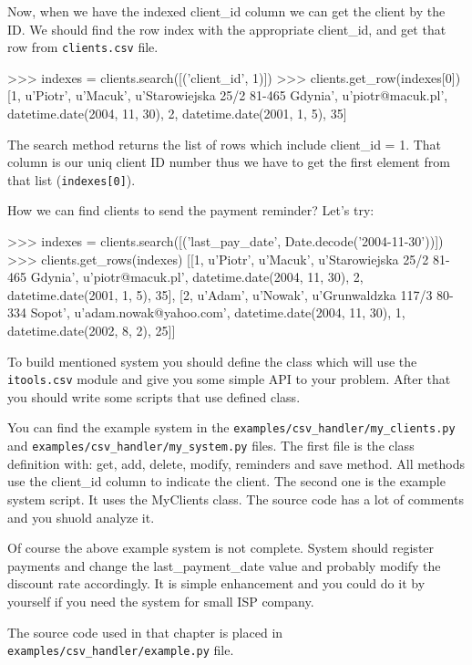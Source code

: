 \documentclass[a4paper]{book}
\begin{document}
Now, when we have the indexed client\_id column we can get the client
by the ID. We should find the row index with the appropriate client\_id,
and get that row from {\tt clients.csv} file.
\begin{code}
    >>> indexes = clients.search([('client_id', 1)])
    >>> clients.get_row(indexes[0])
    [1, u'Piotr', u'Macuk', u'Starowiejska 25/2 81-465 Gdynia', 
    u'piotr@macuk.pl', datetime.date(2004, 11, 30), 2, 
    datetime.date(2001, 1, 5), 35]
\end{code}
The search method returns the list of rows which include client\_id = 1.
That column is our uniq client ID number thus we have to get the first
element from that list ({\tt indexes[0]}).

How we can find clients to send the payment reminder? Let's try:
\begin{code}
    >>> indexes = clients.search([('last_pay_date', Date.decode('2004-11-30'))])
    >>> clients.get_rows(indexes)
    [[1, u'Piotr', u'Macuk', u'Starowiejska 25/2 81-465 Gdynia', 
    u'piotr@macuk.pl', datetime.date(2004, 11, 30), 2, 
    datetime.date(2001, 1, 5), 35], [2, u'Adam', u'Nowak', 
    u'Grunwaldzka 117/3 80-334 Sopot', u'adam.nowak@yahoo.com', 
    datetime.date(2004, 11, 30), 1, datetime.date(2002, 8, 2), 25]]
\end{code}

To build mentioned system you should define the class which will use the
{\tt itools.csv} module and give you some simple API to your problem. After
that you should write some scripts that use defined class.

You can find the example system in the 
{\tt examples/csv\_handler/my\_clients.py} and 
{\tt examples/csv\_handler/my\_system.py} files. The first file is the class
definition with: get, add, delete, modify, reminders and save method. 
All methods use the client\_id column to indicate the client. The second one
is the example system script. It uses the MyClients class. 
The source code has a lot of comments and you shuold analyze it.

Of course the above example system is not complete. System should register
payments and change the last\_payment\_date value and probably modify 
the discount rate accordingly. It is simple enhancement and you could do it 
by yourself if you need the system for small ISP company.

The source code used in that chapter is placed in 
{\tt examples/csv\_handler/example.py} file.
\end{document}
